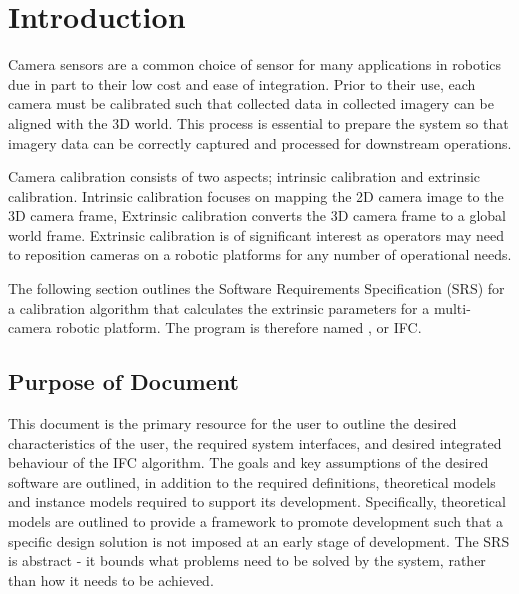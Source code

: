 \documentclass[12pt]{article}
\begin{document}
\section{Introduction}
Camera sensors are a common choice of sensor for many applications in robotics due 
in part to their low cost and ease of integration. Prior to their use, each camera 
must be calibrated such that collected data in collected imagery can be aligned with 
the 3D world. This process is essential to prepare the system so that 
imagery data can be correctly captured and processed for downstream operations.

Camera calibration consists of two aspects; intrinsic calibration and extrinsic 
calibration. Intrinsic calibration focuses on mapping the 2D camera image 
to the 3D camera frame, Extrinsic calibration converts the 3D camera frame
to a global world frame. Extrinsic calibration is of significant interest as  
operators may need to reposition cameras on a robotic platforms for any number of 
operational needs.

The following section outlines the Software Requirements Specification (SRS) for 
a calibration algorithm that calculates the extrinsic parameters for a multi-camera 
robotic platform. The program is therefore named \progname, 
or IFC.


\subsection{Purpose of Document}

This document is the primary resource for the user to outline the desired 
characteristics of the user, the required system interfaces, and desired 
integrated behaviour of the IFC algorithm. The goals and key assumptions of the
desired software are outlined, in addition to the required definitions, 
theoretical models and instance models required to support its development. 
Specifically, theoretical models are outlined to provide a framework to promote 
development such that a specific design solution is not imposed at an early stage 
of development. The SRS is abstract - it bounds what problems need to be solved by 
the system, rather than how it needs to be achieved.
\end{document}
